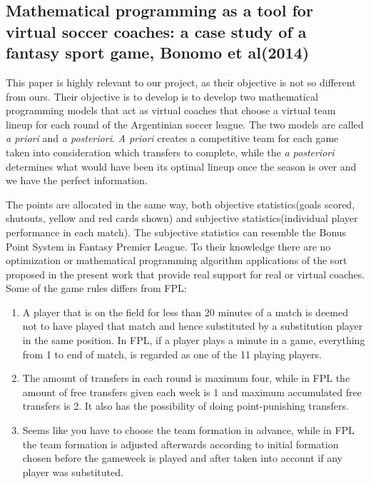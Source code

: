 \subsection{Mathematical programming as a tool for virtual soccer coaches: a case study of a fantasy sport game, Bonomo et al(2014)}

This paper is highly relevant to our project, as their objective is not so different from ours. Their objective is to develop is to develop two mathematical programming models that act as virtual coaches that choose a virtual team lineup for each round of the Argentinian soccer league. The two models are called \textit{a priori} and \textit{a posteriori}. \textit{A priori} creates a competitive team for each game taken into consideration which transfers to complete, while the \textit{a posteriori} determines what would have been its optimal lineup once the season is over and we have the perfect information. 

\newpar

The points are allocated in the same way, both objective statistics(goals scored, shutouts, yellow and red cards shown) and subjective statistics(individual player performance in each match). The subjective statistics can resemble the Bonus Point System in Fantasy Premier League. To their knowledge there are no optimization or mathematical programming algorithm applications of the sort proposed in the present work that provide real support for real or virtual coaches. Some of the game rules differs from FPL: 
\begin{enumerate}
    \item A player that is on the field for less than 20 minutes of a match is deemed not to have played that match and hence substituted by a substitution player in the same position. In FPL, if a player plays a minute in a game, everything from 1 to end of match, is regarded as one of the 11 playing players. 
    \item The amount of transfers in each round is maximum four, while in FPL the amount of free transfers given each week is 1 and maximum accumulated free transfers is 2. It also has the possibility of doing point-punishing transfers. 
    \item Seems like you have to choose the team formation in advance, while in FPL the team formation is adjusted afterwards according to initial formation chosen before the gameweek is played and after taken into account if any player was substituted. 
\end{enumerate}

